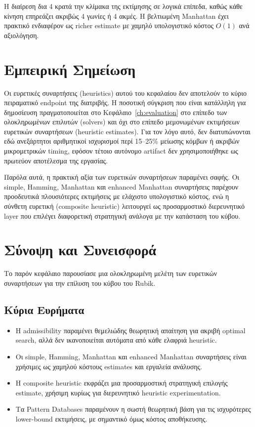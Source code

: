 Η διαίρεση δια 4 κρατά την κλίμακα της εκτίμησης σε λογικά επίπεδα, καθώς κάθε
κίνηση επηρεάζει ακριβώς 4 γωνίες ή 4 ακμές. Η βελτιωμένη Manhattan έχει
πρακτικό ενδιαφέρον ως richer estimate με χαμηλό υπολογιστικό κόστος
$O(1)$ ανά αξιολόγηση.

\section{Εμπειρική Σημείωση}
\label{sec:heuristics-evaluation}

Οι ευρετικές συναρτήσεις (heuristics) αυτού του κεφαλαίου δεν αποτελούν το κύριο
πειραματικό endpoint της διατριβής. Η ποσοτική σύγκριση που είναι κατάλληλη για
δημοσίευση πραγματοποιείται στο Κεφάλαιο~\ref{ch:evaluation} στο επίπεδο των
ολοκληρωμένων επιλυτών (solvers) και όχι στο επίπεδο μεμονωμένων εκτιμήσεων
ευρετικών συναρτήσεων (heuristic estimates). Για τον λόγο αυτό, δεν διατυπώνονται
εδώ ανεξάρτητοι αριθμητικοί ισχυρισμοί περί 15--25\% μείωσης κόμβων ή ακριβών
μικρομετρικών timing, εφόσον τέτοιο αυτόνομο artifact δεν χρησιμοποιήθηκε ως
πρωτεύον αποτέλεσμα της εργασίας.

Παρόλα αυτά, η πρακτική αξία των ευρετικών συναρτήσεων παραμένει σαφής. Οι
simple, Hamming, Manhattan και enhanced Manhattan συναρτήσεις παρέχουν
προοδευτικά πλουσιότερες εκτιμήσεις με ελάχιστο υπολογιστικό κόστος, ενώ η
σύνθετη ευρετική (composite heuristic) λειτουργεί ως προσαρμοστικό διερευνητικό
layer που επιλέγει
διαφορετική στρατηγική ανάλογα με την κατάσταση του κύβου.

\section{Σύνοψη και Συνεισφορά}
\label{sec:heuristics-summary}

Το παρόν κεφάλαιο παρουσίασε μια ολοκληρωμένη μελέτη των ευρετικών συναρτήσεων για την επίλυση του κύβου του Rubik.

\subsection{Κύρια Ευρήματα}

\begin{itemize}
    \item Η admissibility παραμένει θεμελιώδης θεωρητική απαίτηση για ακριβή optimal search, αλλά δεν ικανοποιείται αυτόματα από κάθε ελαφριά heuristic.
    \item Οι simple, Hamming, Manhattan και enhanced Manhattan συναρτήσεις είναι χρήσιμες ως χαμηλού κόστους estimates και εργαλεία ανάλυσης.
    \item Η composite heuristic εκφράζει μια προσαρμοστική στρατηγική επιλογής estimate, χρήσιμη κυρίως για διερευνητικό heuristic experimentation.
    \item Τα Pattern Databases παραμένουν η σωστή θεωρητική βάση για τις ισχυρότερες lower-bound εκτιμήσεις, με σημαντικό όμως κόστος αποθήκευσης.
\end{itemize}

